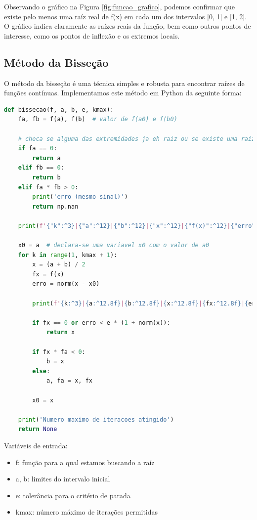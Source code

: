 \documentclass{article}
\begin{document}
Observando o gr\'{a}fico na Figura \ref{fig:funcao_grafico}, podemos confirmar que existe pelo menos uma ra\'{i}z real de f(x) em cada um dos intervalos [0, 1] e [1, 2]. O gr\'{a}fico indica claramente as ra\'{i}zes reais da fun\c{c}\~{a}o, bem como outros pontos de interesse, como os pontos de inflex\~{a}o e os extremos locais.




\subsection{M\'{e}todo da Bisse\c{c}\~{a}o}
O m\'{e}todo da bisse\c{c}\~{a}o \'{e} uma t\'{e}cnica simples e robusta para encontrar ra\'{i}zes de fun\c{c}\~{o}es cont\'{i}nuas. Implementamos este m\'{e}todo em Python da seguinte forma:

\begin{lstlisting}[language=Python]
def bissecao(f, a, b, e, kmax):
    fa, fb = f(a), f(b)  # valor de f(a0) e f(b0)
    
    # checa se alguma das extremidades ja eh raiz ou se existe uma raiz entre as extremidades
    if fa == 0:
        return a
    elif fb == 0:
        return b
    elif fa * fb > 0:
        print('erro (mesmo sinal)')
        return np.nan
    
    print(f'{"k":^3}|{"a":^12}|{"b":^12}|{"x":^12}|{"f(x)":^12}|{"erro":^12}')  # Cabecalho da tabela
    
    x0 = a  # declara-se uma variavel x0 com o valor de a0
    for k in range(1, kmax + 1):
        x = (a + b) / 2
        fx = f(x)
        erro = norm(x - x0)
        
        print(f'{k:^3}|{a:^12.8f}|{b:^12.8f}|{x:^12.8f}|{fx:^12.8f}|{erro:^12.8f}')  # Corpo da tabela
        
        if fx == 0 or erro < e * (1 + norm(x)):
            return x
        
        if fx * fa < 0:
            b = x
        else:
            a, fa = x, fx
        
        x0 = x
    
    print('Numero maximo de iteracoes atingido')
    return None
\end{lstlisting}

Vari\'{a}veis de entrada:
\begin{itemize}
    \item f: fun\c{c}\~{a}o para a qual estamos buscando a ra\'{i}z
    \item a, b: limites do intervalo inicial
    \item e: toler\^{a}ncia para o crit\'{e}rio de parada
    \item kmax: n\'{u}mero m\'{a}ximo de itera\c{c}\~{o}es permitidas
\end{itemize}
\end{document}
